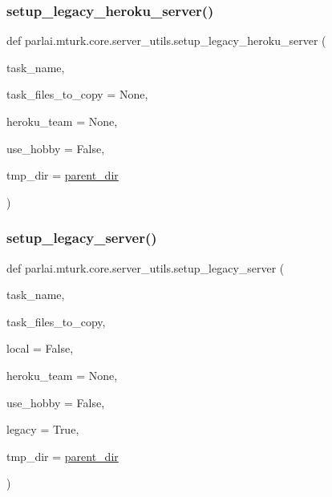 \mbox{\label{namespaceparlai_1_1mturk_1_1core_1_1server__utils_adff2f564896069e0b76ae1b007515a2b}} 
\subsubsection{\texorpdfstring{setup\+\_\+legacy\+\_\+heroku\+\_\+server()}{setup\_legacy\_heroku\_server()}}
{\footnotesize\ttfamily def parlai.\+mturk.\+core.\+server\+\_\+utils.\+setup\+\_\+legacy\+\_\+heroku\+\_\+server (\begin{DoxyParamCaption}\item[{}]{task\+\_\+name,  }\item[{}]{task\+\_\+files\+\_\+to\+\_\+copy = {\ttfamily None},  }\item[{}]{heroku\+\_\+team = {\ttfamily None},  }\item[{}]{use\+\_\+hobby = {\ttfamily False},  }\item[{}]{tmp\+\_\+dir = {\ttfamily \hyperlink{namespaceparlai_1_1mturk_1_1core_1_1server__utils_a193439bdbc25a32b00f1a43e6f8532d8}{parent\+\_\+dir}} }\end{DoxyParamCaption})}

\mbox{\label{namespaceparlai_1_1mturk_1_1core_1_1server__utils_afe9361009645f245de2a07c18cd485bb}} 
\subsubsection{\texorpdfstring{setup\+\_\+legacy\+\_\+server()}{setup\_legacy\_server()}}
{\footnotesize\ttfamily def parlai.\+mturk.\+core.\+server\+\_\+utils.\+setup\+\_\+legacy\+\_\+server (\begin{DoxyParamCaption}\item[{}]{task\+\_\+name,  }\item[{}]{task\+\_\+files\+\_\+to\+\_\+copy,  }\item[{}]{local = {\ttfamily False},  }\item[{}]{heroku\+\_\+team = {\ttfamily None},  }\item[{}]{use\+\_\+hobby = {\ttfamily False},  }\item[{}]{legacy = {\ttfamily True},  }\item[{}]{tmp\+\_\+dir = {\ttfamily \hyperlink{namespaceparlai_1_1mturk_1_1core_1_1server__utils_a193439bdbc25a32b00f1a43e6f8532d8}{parent\+\_\+dir}} }\end{DoxyParamCaption})}

